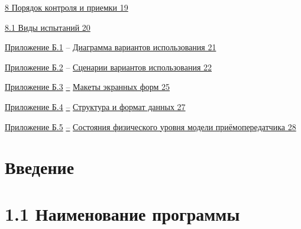 \hyperref[_mqq6yz6vxe9d]{8 Порядок контроля и приемки 19}

\hyperref[ux432ux438ux434ux44b-ux438ux441ux43fux44bux442ux430ux43dux438ux439]{8.1
Виды испытаний 20}

\hyperref[ux43fux440ux438ux43bux43eux436ux435ux43dux438ux435-ux431.1]{Приложение
Б.1} --
\hyperref[ux434ux438ux430ux433ux440ux430ux43cux43cux430-ux432ux430ux440ux438ux430ux43dux442ux43eux432-ux438ux441ux43fux43eux43bux44cux437ux43eux432ux430ux43dux438ux44f]{Диаграмма
вариантов использования 21}

\hyperref[ux43fux440ux438ux43bux43eux436ux435ux43dux438ux435-ux431.2]{Приложение
Б.2} --
\hyperref[ux441ux446ux435ux43dux430ux440ux438ux438-ux432ux430ux440ux438ux430ux43dux442ux43eux432-ux438ux441ux43fux43eux43bux44cux437ux43eux432ux430ux43dux438ux44f]{Сценарии
вариантов использования 22}

\hyperref[ux43fux440ux438ux43bux43eux436ux435ux43dux438ux435-ux431.3]{Приложение
Б.3}
\hyperref[ux43fux440ux438ux43bux43eux436ux435ux43dux438ux435-ux431.3]{--}
\hyperref[ux43cux430ux43aux435ux442ux44b-ux44dux43aux440ux430ux43dux43dux44bux445-ux444ux43eux440ux43c]{Макеты
экранных форм 25}

\hyperref[ux43fux440ux438ux43bux43eux436ux435ux43dux438ux435-ux431.4]{Приложение
Б.4}
\hyperref[ux43fux440ux438ux43bux43eux436ux435ux43dux438ux435-ux431.4]{--}
\hyperref[ux441ux442ux440ux443ux43aux442ux443ux440ux430-ux438-ux444ux43eux440ux43cux430ux442-ux434ux430ux43dux43dux44bux445]{Структура
и формат данных 27}

\hyperref[ux43fux440ux438ux43bux43eux436ux435ux43dux438ux435-ux431.5]{Приложение
Б.5}
\hyperref[ux43fux440ux438ux43bux43eux436ux435ux43dux438ux435-ux431.5]{--}
\hyperref[ux441ux43eux441ux442ux43eux44fux43dux438ux44f-ux444ux438ux437ux438ux447ux435ux441ux43aux43eux433ux43e-ux443ux440ux43eux432ux43dux44f-ux43cux43eux434ux435ux43bux438-ux43fux440ux438ux451ux43cux43eux43fux435ux440ux435ux434ux430ux442ux447ux438ux43aux430]{Состояния
физического уровня модели приёмопередатчика 28}

\section{Введение}\label{ux432ux432ux435ux434ux435ux43dux438ux435}

\section{1.1 Наименование
программы}\label{ux43dux430ux438ux43cux435ux43dux43eux432ux430ux43dux438ux435-ux43fux440ux43eux433ux440ux430ux43cux43cux44b}

